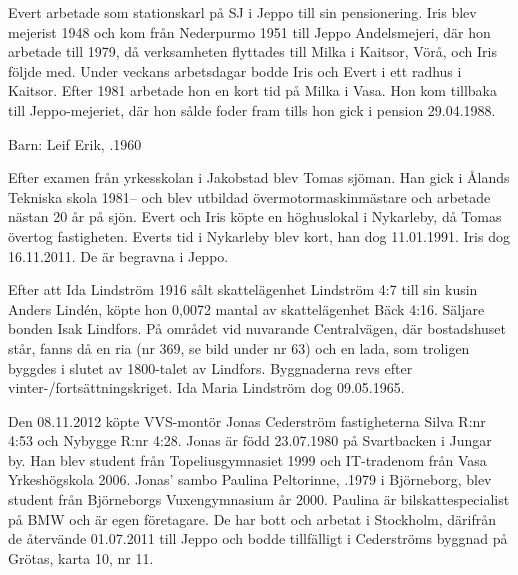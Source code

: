 Evert arbetade som 	stationskarl på SJ i Jeppo till sin pensionering. Iris blev mejerist 1948 och kom från Nederpurmo 1951 till Jeppo Andelsmejeri, där hon arbetade till 1979, då verksamheten flyttades till Milka i Kaitsor, Vörå, och Iris följde med. Under veckans arbetsdagar bodde Iris och Evert i ett radhus i Kaitsor. Efter 1981 arbetade hon en kort tid på Milka i Vasa. Hon kom tillbaka till Jeppo-mejeriet, där hon sålde foder fram tills hon gick i pension 29.04.1988.

Barn: 	 Leif Erik,	.1960

Efter examen från yrkesskolan i Jakobstad blev Tomas sjöman. Han gick i Ålands Tekniska skola 1981-- och blev utbildad övermotormaskinmästare och arbetade nästan 20 år på sjön. Evert och Iris köpte en höghuslokal i Nykarleby, då Tomas övertog fastigheten. Everts tid i Nykarleby blev kort, han dog 11.01.1991. Iris dog 16.11.2011. De är begravna i Jeppo.


Efter att Ida Lindström 1916 sålt skattelägenhet Lindström 4:7 till sin	kusin Anders Lindén, köpte hon 0,0072 mantal av skattelägenhet Bäck 4:16. Säljare bonden Isak Lindfors. På området vid nuvarande Centralvägen, där bostadshuset står, fanns då en ria (nr 369, se bild under nr 63) och en lada, som troligen byggdes i slutet av 1800-talet av Lindfors. Byggnaderna revs efter vinter-/fortsättningskriget. Ida Maria Lindström dog 09.05.1965.






Den 08.11.2012 köpte VVS-montör Jonas Cederström fastigheterna Silva R:nr 4:53 och Nybygge R:nr 4:28. Jonas är född 23.07.1980 på Svartbacken i Jungar by. Han blev student från Topeliusgymnasiet 1999 och IT-tradenom från Vasa Yrkeshögskola 2006. Jonas' sambo Paulina Peltorinne, .1979 i Björneborg, blev student från Björneborgs Vuxengymnasium år 2000. Paulina är bilskattespecialist på BMW och är egen företagare. De har bott och arbetat i Stockholm, därifrån de återvände 01.07.2011 till Jeppo och bodde tillfälligt i Cederströms byggnad på Grötas, karta 10, nr 11.
\begin{jhchildren}
  \item {}
  \item {}
\end{jhchildren}


